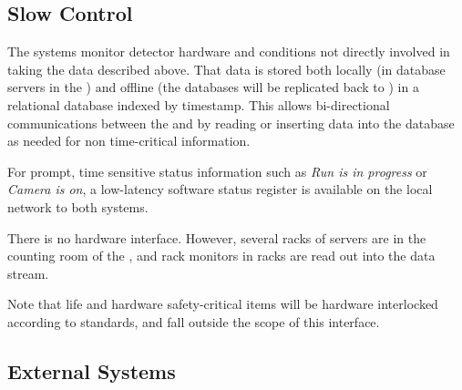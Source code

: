 \subsection{Slow Control}
\label{sec:fd-daq-intfc-sc}
\label{sec:fd-daq-intfc-sc}

The  systems monitor detector hardware and conditions not
directly involved in taking the data described above.
That data is stored both locally (in  database servers in the
) and offline (the databases will be replicated back to \fnal)
in a relational database indexed by timestamp.
This allows bi-directional communications between the  and  by
reading or inserting data into the database as needed for non
time-critical information.  

For prompt, time sensitive status information such as \textit{Run is in
progress} or \textit{Camera is on}, a low-latency software status register
is available on the local network to both systems.

There is no hardware interface. However, several racks of  servers are in the counting room of the , and rack monitors in  racks are read out into the  data stream.

Note that life and hardware safety-critical items will be hardware
interlocked %
according to \fnal standards, and fall outside the scope of this interface.


\subsection{External Systems} %
\label{sec:fd-daq-intfc-ext}



